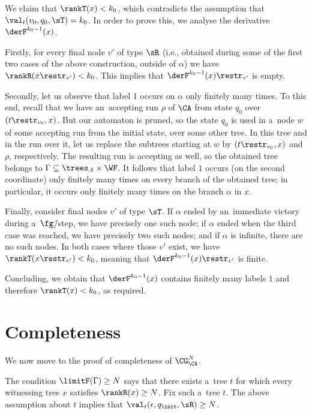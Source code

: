 \documentclass{lmcs}
\numberwithin{equation}{section}
\numberwithin{figure}{section}
\begin{document}
We claim that $\rankT(x)< k_0$, which contradicts the assumption that $\val_t(v_0,q_0,\sT)=k_0$.
In order to prove this, we analyse the derivative $\derF^{k_0-1}(x)$.

Firstly, for every final node $v'$ of type $\sR$ (i.e., obtained during some of the first two cases of the above construction, outside of $\alpha$) we have $\rankR(x\restr_{v'})<k_0$.
This implies that $\derF^{k_0-1}(x)\restr_{v'}$ is empty.

Secondly, let us observe that label $1$ occurs on $\alpha$ only finitely many times.
To this end, recall that we have an~accepting run $\rho$ of $\CA$ from state $q_0$ over $(t\restr_{v_0},x)$.
But our automaton is pruned, so the state $q_0$ is used in a~node $w$ of some accepting run from the initial state, over some other tree.
In this tree and in the run over it, let us replace the subtrees starting at $w$ by $(t\restr_{v_0},x)$ and $\rho$, respectively.
The resulting run is accepting as well, so the obtained tree belongs to $\Gamma\subseteq\trees_A\times\WF$.
It follows that label $1$ occurs (on the second coordinate) only finitely many times on every branch of the obtained tree;
in particular, it occurs only finitely many times on the branch $\alpha$ in $x$.

Finally, consider final nodes $v'$ of type $\sT$.
If $\alpha$ ended by an~immediate victory during a~$\fg$\=/step, we have precisely one such node;
if $\alpha$ ended when the third case was reached, we have precisely two such nodes;
and if $\alpha$ is infinite, there are no such nodes.
In both cases where those $v'$ exist, we have $\rankT(x\restr_{v'})<k_0$, meaning that $\derF^{k_0-1}(x)\restr_{v'}$ is finite.

Concluding, we obtain that $\derF^{k_0-1}(x)$ contains finitely many labels $1$ and therefore $\rankT(x)<k_0$, as required.



\section{Completeness}
\label{sec:completeness}

We now move to the proof of completeness of $\CG^N_\CA$.

\lemCompleteness*

\noindent %
The condition $\limitF(\Gamma)\geq N$ says that there exists a~tree $t$ for which every witnessing tree $x$ satisfies $\rankR(x)\geq N$.
Fix such a~tree $t$.
The above assumption about $t$ implies that $\val_t(\epsilon,q_\init,\sR)\geq N$.
\end{document}
